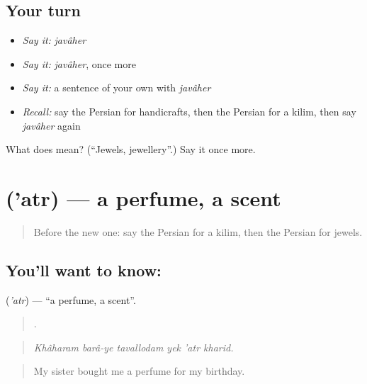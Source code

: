 \subsection*{Your turn}
\begin{itemize}
\raggedright
  \item \emph{Say it:} \emph{javâher}
  \item \emph{Say it:} \emph{javâher}, once more
  \item \emph{Say it:} a sentence of your own with \emph{javâher}
  \item \emph{Recall:} say the Persian for handicrafts, then the Persian for a kilim, then say \emph{javâher} again
\end{itemize}

\begin{tcolorbox}[breakable,colback=teal!4,colframe=teal!35!black,title={Before you move on}]
What does  mean? (\textquotedblleft{}Jewels, jewellery\textquotedblright{}.) Say it once more.
\end{tcolorbox}
\section[\texorpdfstring{\fa{عطر} ('atr)}{عطر ('atr)}]{ ('atr) — a perfume, a scent}

\label{lesson:FA-C463-atr}



\begin{quote}
Before the new one: say the Persian for a kilim, then the Persian for jewels.
\end{quote}

\subsection*{You'll want to know: }
\textbf{} (\emph{'atr}) — \textquotedblleft{}a perfume, a scent\textquotedblright{}.

\begin{quote}
     .
\end{quote}

\begin{quote}
\emph{Khâharam barâ-ye tavallodam yek 'atr kharid.}
\end{quote}

\begin{quote}
My sister bought me a perfume for my birthday.
\end{quote}

